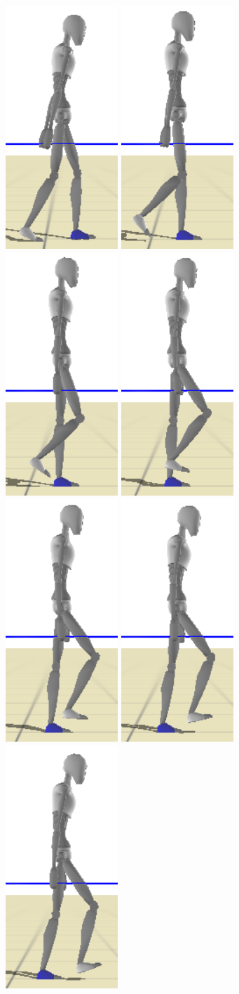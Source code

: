 \documentclass[runningheads,a4paper,10pt]{llncs}
\begin{document}
\begin{figure}[t]
\begin{minipage}{0.4\columnwidth}
\includegraphics[width=0.101\columnwidth]{images/strips/0_75/1.png}
\includegraphics[width=0.101\columnwidth]{images/strips/0_75/2.png}
\includegraphics[width=0.101\columnwidth]{images/strips/0_75/3.png}
\includegraphics[width=0.101\columnwidth]{images/strips/0_75/4.png}
\includegraphics[width=0.101\columnwidth]{images/strips/0_75/5.png}
\includegraphics[width=0.101\columnwidth]{images/strips/0_75/6.png}
\includegraphics[width=0.101\columnwidth]{images/strips/0_75/7.png}

\end{minipage}
\end{figure}
\end{document}
